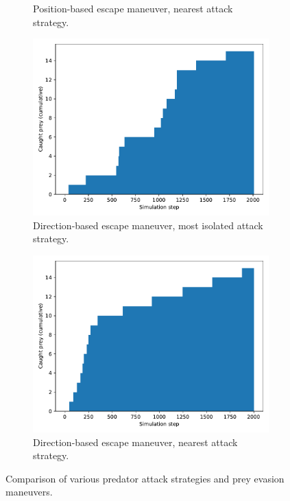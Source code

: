 \documentclass[9pt]{pnas-new}
\begin{document}
\begin{figure}[h]
\begin{subfigure}[t]{0.4\linewidth}
        \caption{Position-based escape maneuver, nearest attack strategy.}
    \end{subfigure}
    \hspace{0.02\linewidth} %
    \begin{subfigure}[t]{0.4\linewidth}
        \includegraphics[width=\linewidth]{avoid_direction_attack_peripheral/predator_success_cumulative_2008.pdf}
        \caption{Direction-based escape maneuver, most isolated attack strategy.}
    \end{subfigure}%
    \hspace{0.02\linewidth} %
    \begin{subfigure}[t]{0.4\linewidth}
        \includegraphics[width=\linewidth]{avoid_direction_attack_nearest/predator_success_cumulative_2001.pdf}
        \caption{Direction-based escape maneuver, nearest attack strategy.}
    \end{subfigure}
    \caption{Comparison of various predator attack strategies and prey evasion maneuvers.}
    \label{fig:sim_results_01}
\end{figure}
\end{document}
